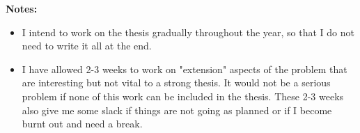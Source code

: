 \noindent\textbf{Notes:}

\begin{itemize}
\item 	I intend to work on the thesis gradually throughout the year,
	so that I do not need to write it all at the end.

\item	I have allowed 2-3 weeks to work on "extension" aspects of the
	problem that are interesting but not vital to a strong thesis.  It
	would not be a serious problem if none of this work can be included in
	the thesis.  These 2-3 weeks also give me some slack if things are not
	going as planned or if I become burnt out and need a break.
\end{itemize}


